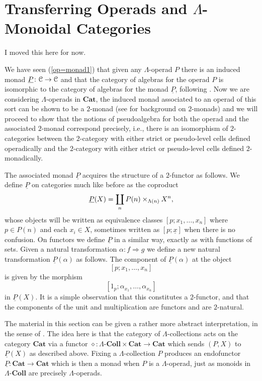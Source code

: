 \section{Transferring Operads and \texorpdfstring{$\Lambda$}{L}-Monoidal Categories}

\begin{rem}
I moved this here for
now.
\end{rem}

We have seen (\cref{op=monad1}) that given any $\Lambda$-operad $P$ there is an induced monad $\underline{P} \colon \mathcal{C} \rightarrow \mathcal{C}$ and that the category of algebras for the operad $P$ is isomorphic to the category of algebras for the monad $\underline{P}$, following \cite{maygeom}. Now we are considering $\Lambda$-operads in $\mathbf{Cat}$, the induced monad associated to an operad of this sort can be shown to be a $2$-monad (see \cite{KS} for background on $2$-monads) and we will proceed to show that the notions of pseudoalgebra for both the operad and the associated $2$-monad correspond precisely, i.e., there is an isomorphism of $2$-categories between the $2$-category with either strict or pseudo-level cells defined operadically and the $2$-category with either strict or pseudo-level cells defined $2$-monadically.



The associated monad $\underline{P}$ acquires the structure of a $2$-functor as follows. We define $\underline{P}$ on categories much like before as  the coproduct
    \[
        \underline{P}(X) = \coprod_n P(n) \times_{\Lambda(n)} X^{n},
    \]
whose objects will be written as equivalence classes $[p;x_1,\ldots,x_n]$ where $p \in P(n)$ and each $x_i \in X$, sometimes written as $[p;\underline{x}]$ when there is no confusion. On functors we define $\underline{P}$ in a similar way, exactly as with functions of sets. Given a natural transformation $\alpha \colon f \Rightarrow g$ we define a new natural transformation $\underline{P}(\alpha)$ as follows. The component of $\underline{P}(\alpha)$ at the object
    \[
        [p;x_1,\ldots,x_n]
    \]
is given by the morphism
    \[
        [1_p;\alpha_{x_1},\ldots,\alpha_{x_n}]
    \]
in $\underline{P}(X)$.
It is a simple observation that this constitutes a $2$-functor, and that the components of the unit and multiplication are functors and are $2$-natural.

\begin{rem}
The material in this section can be given a rather more abstract interpretation, in the sense of \cite{KL97}. The idea here is that the category of $\Lambda$-collections acts on the category $\mathbf{Cat}$ via a functor $\diamond \colon \Lambda\text{-}\mathbf{Coll} \times \mathbf{Cat} \rightarrow \mathbf{Cat}$ which sends $(P,X)$ to $\underline{P}(X)$ as described above. Fixing a $\Lambda$-collection $P$ produces an endofunctor $\underline{P} \colon \mathbf{Cat} \rightarrow \mathbf{Cat}$ which is then a monad when $P$ is a $\Lambda$-operad, just as monoids in $\Lambda\text{-}\mathbf{Coll}$ are precisely $\Lambda$-operads.
\end{rem}


